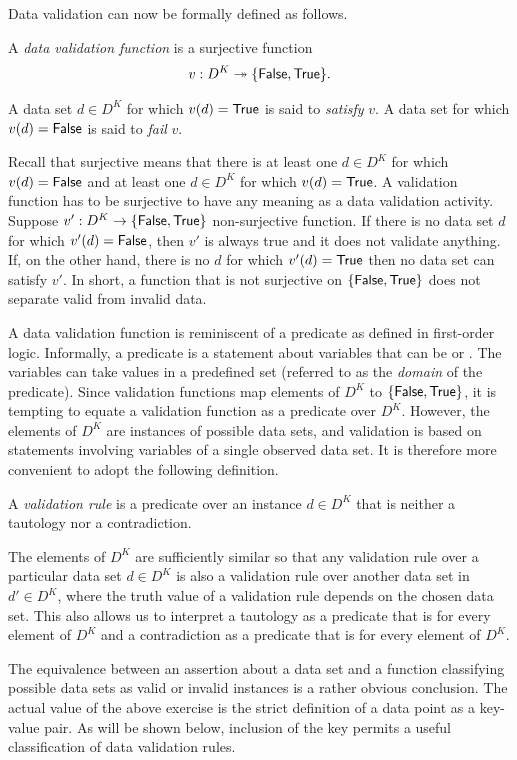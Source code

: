 Data validation can now be formally defined as follows.
\begin{definition}
\label{def:valifun}
A \emph{data validation function} is a surjective function 
$$
v: D^K\twoheadrightarrow \{\textsf{False}{},\textsf{True}{}\}.
$$
\end{definition}
A data set $d\in D^K$ for which $v(d)=\textsf{True}{}$ is said to \emph{satisfy} $v$.  A
data set for which $v(d)=\textsf{False}{}$ is said to \emph{fail} $v$.

Recall that surjective means that there is at least one $d\in D^K$ for which
$v(d)=\textsf{False}{}$ and at least one $d\in D^K$ for which $v(d)=\textsf{True}{}$.  A
validation function has to be surjective to have any meaning as a data
validation activity. Suppose  $v':D^K\to \{\textsf{False}{},\textsf{True}{}\}$ non-surjective
function. If there is no data set $d$ for which $v'(d)=\textsf{False}{}$, then $v'$ is
always true and it does not validate anything. If, on the other hand, there is
no $d$ for which $v'(d)=\textsf{True}{}$ then no data set can satisfy $v'$. In short, a
function that is not surjective on $\{\textsf{False}{}, \textsf{True}{}\}$ does not separate valid
from invalid data.


A data validation function is reminiscent of a predicate as defined in
first-order logic. Informally, a predicate is a statement about variables that
can be \yay{} or \nay{}. The variables can take values in a predefined set
(referred to as the \emph{domain} of the predicate). Since validation functions
map elements of $D^K$ to $\{\textsf{False}{}, \textsf{True}{}\}$, it is tempting to equate a
validation function as a predicate over $D^K$. However, the elements of $D^K$
are instances of possible data sets, and validation is based on statements
involving variables of a single observed data set. It is therefore more
convenient to adopt the following definition.
%
\begin{definition}
A \emph{validation rule} is a predicate over an instance $d\in D^K$ that is
neither a tautology nor a contradiction.
\label{def:validationrule}
\end{definition}
%
The elements of $D^K$ are sufficiently similar so that any validation rule over
a particular data set $d\in D^K$ is also a validation rule over another data
set in $d'\in D^K$, where the truth value of a validation rule depends on the
chosen data set. This also allows us to interpret a tautology as a predicate
that is \yay{} for every element of $D^K$ and a contradiction as a predicate
that is \nay{} for every element of $D^K$.  

The equivalence between an assertion about a data set and a function
classifying possible data sets as valid or invalid instances is a rather
obvious conclusion. The actual value of the above exercise is the strict
definition of a data point as a key-value pair. As will be shown below,
inclusion of the key permits a useful classification of data validation rules.

